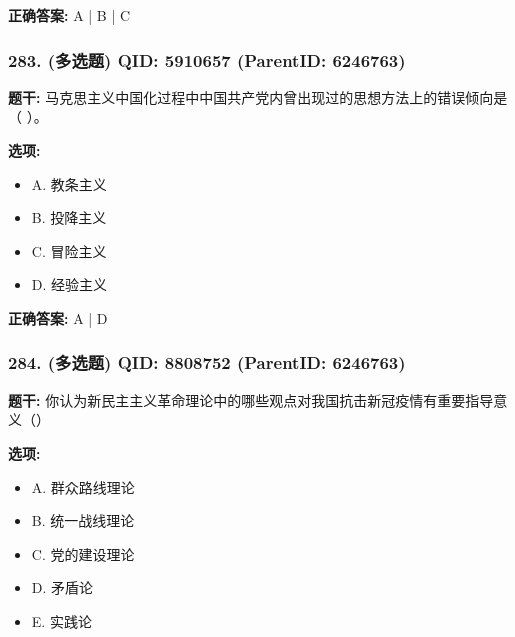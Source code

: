 \documentclass[12pt,UTF8]{ctexart}
\begin{document}
\textbf{正确答案:}
A | B | C

\vspace{0.3em}\hrulefill\vspace{0.7em}

\subsubsection*{283. (多选题) \small QID: 5910657 (ParentID: 6246763)}

\textbf{题干:}
马克思主义中国化过程中中国共产党内曾出现过的思想方法上的错误倾向是（ ）。



\textbf{选项:}
\begin{itemize}[leftmargin=*]

  \item A. 教条主义

  \item B. 投降主义

  \item C. 冒险主义

  \item D. 经验主义

\end{itemize}

\textbf{正确答案:}
A | D

\vspace{0.3em}\hrulefill\vspace{0.7em}

\subsubsection*{284. (多选题) \small QID: 8808752 (ParentID: 6246763)}

\textbf{题干:}
你认为新民主主义革命理论中的哪些观点对我国抗击新冠疫情有重要指导意义（）



\textbf{选项:}
\begin{itemize}[leftmargin=*]

  \item A. 群众路线理论

  \item B. 统一战线理论

  \item C. 党的建设理论

  \item D. 矛盾论

  \item E. 实践论

\end{itemize}
\end{document}
